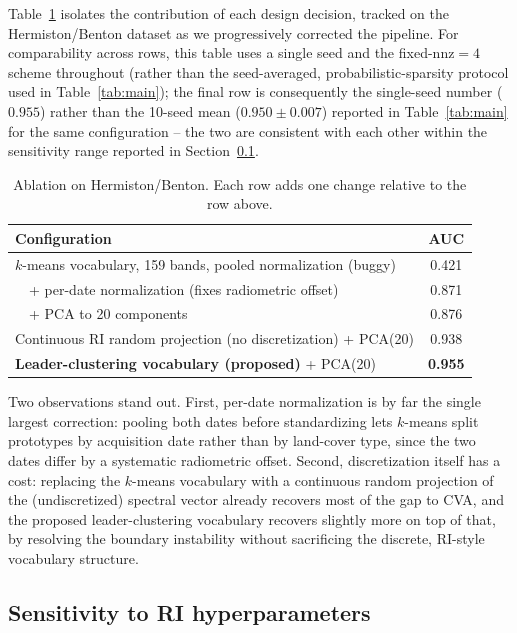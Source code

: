 \documentclass[11pt]{article}
\begin{document}
Table~\ref{tab:ablation} isolates the contribution of each design decision, tracked on the Hermiston/Benton dataset as we progressively corrected the pipeline. For comparability across rows, this table uses a single seed and the fixed-$\mathrm{nnz}=4$ scheme throughout (rather than the seed-averaged, probabilistic-sparsity protocol used in Table~\ref{tab:main}); the final row is consequently the single-seed number ($0.955$) rather than the 10-seed mean ($0.950 \pm 0.007$) reported in Table~\ref{tab:main} for the same configuration -- the two are consistent with each other within the sensitivity range reported in Section~\ref{sec:sensitivity}.

\begin{table}[h]
\centering
\caption{Ablation on Hermiston/Benton. Each row adds one change relative to the row above.}
\label{tab:ablation}
\begin{tabular}{lc}
\toprule
Configuration & AUC \\
\midrule
$k$-means vocabulary, 159 bands, pooled normalization (buggy) & 0.421 \\
$\quad$+ per-date normalization (fixes radiometric offset) & 0.871 \\
$\quad$+ PCA to 20 components & 0.876 \\
Continuous RI random projection (no discretization) + PCA(20) & 0.938 \\
\textbf{Leader-clustering vocabulary (proposed)} + PCA(20) & \textbf{0.955} \\
\bottomrule
\end{tabular}
\end{table}

Two observations stand out. First, per-date normalization is by far the single largest correction: pooling both dates before standardizing lets $k$-means split prototypes by acquisition date rather than by land-cover type, since the two dates differ by a systematic radiometric offset. Second, discretization itself has a cost: replacing the $k$-means vocabulary with a continuous random projection of the (undiscretized) spectral vector already recovers most of the gap to CVA, and the proposed leader-clustering vocabulary recovers slightly more on top of that, by resolving the boundary instability without sacrificing the discrete, RI-style vocabulary structure.

\subsection{Sensitivity to RI hyperparameters}
\label{sec:sensitivity}
\end{document}
